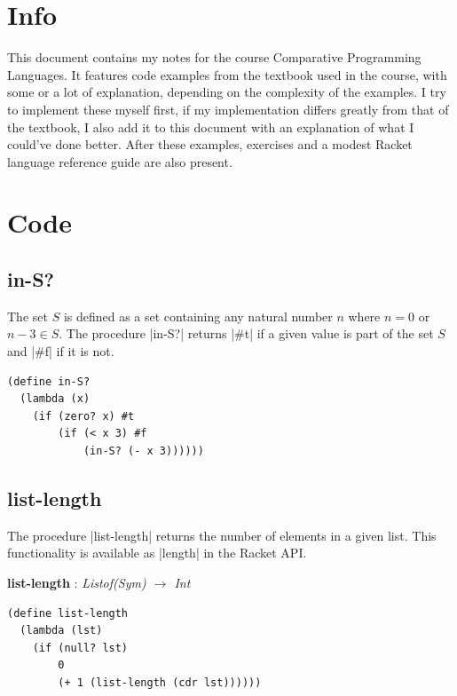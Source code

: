 \documentclass[a4paper]{article}
\begin{document}
\tableofcontents

\newpage

\section{Info}

This document contains my notes for the course Comparative Programming Languages. It features code examples from the textbook used in the course, with some or a lot of explanation, depending on the complexity of the examples. I try to implement these myself first, if my implementation differs greatly from that of the textbook, I also add it to this document with an explanation of what I could've done better. After these examples, exercises and a modest Racket language reference guide are also present.

\newpage

\section{Code}

\subsection{in-S?}

The set $S$ is defined as a set containing any natural number $n$ where $n = 0$ or $n - 3 \in S$. The procedure |in-S?| returns |#t| if a given value is part of the set $S$ and |#f| if it is not.

\begin{lstlisting}
(define in-S?
  (lambda (x)
    (if (zero? x) #t
        (if (< x 3) #f
            (in-S? (- x 3))))))
\end{lstlisting}

\subsection{list-length}

The procedure |list-length| returns the number of elements in a given list. This functionality is available as |length| in the Racket API.

\textbf{list-length} : \textit{Listof(Sym) $\rightarrow$ Int}
\begin{lstlisting}[aboveskip=0pt]
(define list-length
  (lambda (lst)
    (if (null? lst)
        0
        (+ 1 (list-length (cdr lst))))))
\end{lstlisting}
\end{document}
